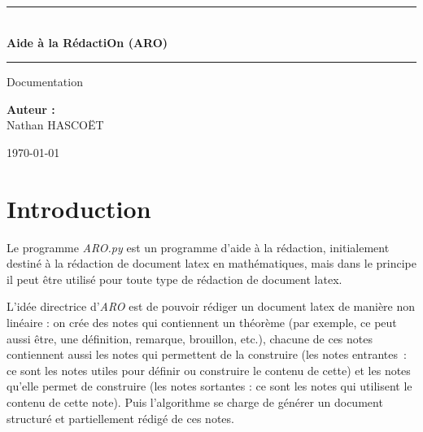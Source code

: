 \documentclass[12pt,a4paper]{article}
\begin{document}
	
	\begin{titlepage}
		\centering
		
		\vspace*{7cm}
		
		\rule{\linewidth}{0.5mm} \\[0.4cm]
		
		{\color{bleuTitre} \Huge \bfseries Aide à la RédactiOn (ARO)} \\[0.4cm]
		
		\rule{\linewidth}{0.5mm}
		
		\vspace{1.5cm}
		
		{\Large Documentation}
		
		\vfill
		
		\hfill
		\begin{minipage}{0.45\textwidth}
			\begin{flushright} \large
				\textbf{Auteur :} \\
				Nathan \textsc{HASCOËT}
			\end{flushright}
		\end{minipage}
		
		\vspace{2cm}
		
		{\large \today}
		
	\end{titlepage}
	
	\tableofcontents
	
	\newpage
	
	\setcounter{page}{1}
	
	\section{Introduction}
	
	Le programme \textit{ARO.py} est un programme d'aide à la rédaction, initialement destiné à la rédaction de document latex en mathématiques, mais dans le principe il peut être utilisé pour toute type de rédaction de document latex.
	
	L'idée directrice d'\textit{ARO} est de pouvoir rédiger un document latex de manière non linéaire : on crée des notes qui contiennent un théorème (par exemple, ce peut aussi être, une définition, remarque, brouillon, etc.), chacune de ces notes contiennent aussi les notes qui permettent de la construire (les notes entrantes : ce sont les notes utiles pour définir ou construire le contenu de cette) et les notes qu'elle permet de construire (les notes sortantes : ce sont les notes qui utilisent le contenu de cette note). Puis l'algorithme se charge de générer un document structuré et partiellement rédigé de ces notes.
	
\end{document}
